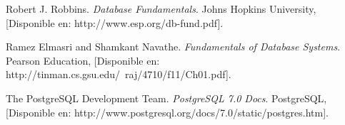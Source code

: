\documentclass[spanish,12pt,letterpapper]{article}
\begin{document}
	\pagebreak
	\begin{thebibliography}{9}
		
		 Robert J. Robbins. 
		\emph{Database Fundamentals}. Johns Hopkins University, [Disponible en: http://www.esp.org/db-fund.pdf].
		
		 Ramez Elmasri and Shamkant Navathe. 
		\emph{Fundamentals of Database Systems}. Pearson Education, [Disponible en: http://tinman.cs.gsu.edu/~raj/4710/f11/Ch01.pdf].
		
		 The PostgreSQL Development Team. 
		\emph{PostgreSQL 7.0 Docs}. PostgreSQL, [Disponible en: http://www.postgresql.org/docs/7.0/static/postgres.htm].
		

	\end{thebibliography}
\end{document}
